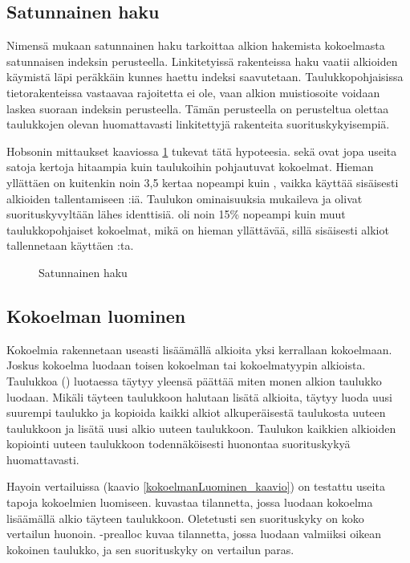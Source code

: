 \subsection{Satunnainen haku}
Nimensä mukaan satunnainen haku tarkoittaa alkion hakemista kokoelmasta satunnaisen indeksin perusteella. Linkitetyissä rakenteissa haku vaatii alkioiden käymistä läpi peräkkäin kunnes haettu indeksi saavutetaan. Taulukkopohjaisissa tietorakenteissa vastaavaa rajoitetta ei ole, vaan alkion muistiosoite voidaan laskea suoraan indeksin perusteella. Tämän perusteella on perusteltua olettaa taulukkojen olevan huomattavasti linkitettyjä rakenteita suorituskykyisempiä.

Hobsonin mittaukset kaaviossa \ref{satunnainenHaku_kaavio} tukevat tätä hypoteesia.  sekä  ovat jopa useita satoja kertoja hitaampia kuin taulukoihin pohjautuvat kokoelmat. Hieman yllättäen  on kuitenkin noin 3,5 kertaa nopeampi kuin , vaikka  käyttää sisäisesti alkioiden tallentamiseen :iä. Taulukon ominaisuuksia mukaileva  ja  olivat suorituskyvyltään lähes identtisiä.  oli noin 15\% nopeampi kuin muut taulukkopohjaiset kokoelmat, mikä on hieman yllättävää, sillä sisäisesti alkiot tallennetaan käyttäen :ta.

\begin{figure}[h]
    \centering
    
    \caption{Satunnainen haku}\label{satunnainenHaku_kaavio}
\end{figure}


\subsection{Kokoelman luominen}
Kokoelmia rakennetaan useasti lisäämällä alkioita yksi kerrallaan kokoelmaan. Joskus kokoelma luodaan toisen kokoelman tai kokoelmatyypin alkioista. Taulukkoa () luotaessa täytyy yleensä päättää miten monen alkion taulukko luodaan. Mikäli täyteen taulukkoon halutaan lisätä alkioita, täytyy luoda uusi suurempi taulukko ja kopioida kaikki alkiot alkuperäisestä taulukosta uuteen taulukkoon ja lisätä uusi alkio uuteen taulukkoon. Taulukon kaikkien alkioiden kopiointi uuteen taulukkoon todennäköisesti huonontaa suorituskykyä huomattavasti.

Hayoin vertailuissa (kaavio \ref{kokoelmanLuominen_kaavio}) on testattu useita tapoja kokoelmien luomiseen.  kuvastaa tilannetta, jossa luodaan kokoelma lisäämällä alkio täyteen taulukkoon. Oletetusti sen suorituskyky on koko vertailun huonoin. -prealloc kuvaa tilannetta, jossa luodaan valmiiksi oikean kokoinen taulukko, ja sen suorituskyky on vertailun paras.

